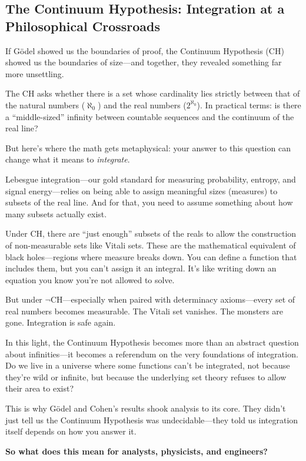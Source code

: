 \subsection{The Continuum Hypothesis: Integration at a Philosophical Crossroads}

If Gödel showed us the boundaries of proof, the Continuum Hypothesis (CH) showed us the boundaries of size—and together, they revealed something far more unsettling.

The CH asks whether there is a set whose cardinality lies strictly between that of the natural numbers (\( \aleph_0 \)) and the real numbers (\( 2^{\aleph_0} \)). In practical terms: is there a “middle-sized” infinity between countable sequences and the continuum of the real line?

But here’s where the math gets metaphysical: your answer to this question can change what it means to \emph{integrate}.

Lebesgue integration—our gold standard for measuring probability, entropy, and signal energy—relies on being able to assign meaningful sizes (measures) to subsets of the real line. And for that, you need to assume something about how many subsets actually exist.

Under CH, there are “just enough” subsets of the reals to allow the construction of non-measurable sets like Vitali sets. These are the mathematical equivalent of black holes—regions where measure breaks down. You can define a function that includes them, but you can’t assign it an integral. It’s like writing down an equation you know you’re not allowed to solve.

But under \( \neg \)CH—especially when paired with determinacy axioms—every set of real numbers becomes measurable. The Vitali set vanishes. The monsters are gone. Integration is safe again.

In this light, the Continuum Hypothesis becomes more than an abstract question about infinities—it becomes a referendum on the very foundations of integration. Do we live in a universe where some functions can’t be integrated, not because they’re wild or infinite, but because the underlying set theory refuses to allow their area to exist?

This is why Gödel and Cohen’s results shook analysis to its core. They didn’t just tell us the Continuum Hypothesis was undecidable—they told us integration itself depends on how you answer it.

\vspace{1em}
\textbf{So what does this mean for analysts, physicists, and engineers?}

